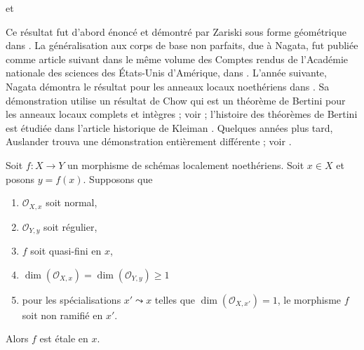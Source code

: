 \begin{lemma}
\label{lemma-purity}
\begin{reference}
\cite{Nagata-Purity} et \cite[exposé X, théorème 3.1]{SGA1}
\end{reference}
\begin{history}
Ce résultat fut d'abord énoncé et démontré par Zariski sous
forme géométrique dans \cite{Zariski-Purity}.
La généralisation aux corps de base non parfaits, due à Nagata,
fut publiée comme article suivant dans le même volume des
Comptes rendus de l'Académie nationale des sciences des États-Unis d'Amérique,
dans \cite{Nagata-Remarks-Purity}. L'année suivante, Nagata
démontra le résultat pour les anneaux locaux noethériens dans \cite{Nagata-Purity}.
Sa démonstration utilise un résultat de Chow qui est un théorème de Bertini pour les
anneaux locaux complets et intègres ; voir \cite{Chow-Bertini} ;
l'histoire des théorèmes de Bertini est étudiée dans
l'article historique de Kleiman \cite{Kleiman-Bertini}.
Quelques années plus tard, Auslander trouva une démonstration entièrement différente ;
voir \cite{Auslander-Purity}.
\end{history}
Soit $f : X \to Y$ un morphisme de schémas localement noethériens.
Soit $x \in X$ et posons $y = f(x)$. Supposons que
\begin{enumerate}
\item $\mathcal{O}_{X, x}$ soit normal,
\item $\mathcal{O}_{Y, y}$ soit régulier,
\item $f$ soit quasi-fini en $x$,
\item $\dim(\mathcal{O}_{X, x}) = \dim(\mathcal{O}_{Y, y}) \geq 1$
\item pour les spécialisations $x' \leadsto x$ telles que
$\dim(\mathcal{O}_{X, x'}) = 1$, le morphisme $f$ soit non ramifié en $x'$.
\end{enumerate}
Alors $f$ est étale en $x$.
\end{lemma}

